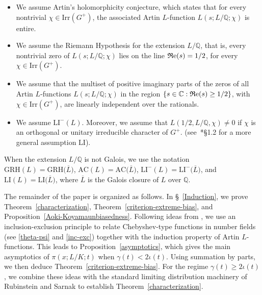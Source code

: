 \documentclass[12pt]{amsart}
\numberwithin{equation}{section}
\newcommand{\Q}{\mathbb Q}
\newcommand{\C}{\mathbb C}
\renewcommand{\Re}{{\mathfrak R}{\rm e}}
\theoremstyle{definition}
\theoremstyle{remark}
\begin{document}
\begin{itemize}
    \item[$\mathrm{AC}(L)$:] We assume Artin's holomorphicity conjecture, which states that for every nontrivial $\chi \in \mathrm{Irr}(G^+)$, the associated Artin $L$-function $L(s; L/\Q; \chi)$ is entire.
    
    \item[$\mathrm{GRH}(L)$:] We assume the Riemann Hypothesis for the extension $L/\Q$, that is, every nontrivial zero of $L(s; L/\Q; \chi)$ lies on the line $\Re(s) = 1/2$, for every $\chi \in \mathrm{Irr}(G^+)$.
    
    \item[$\mathrm{LI}^-(L)$:] We assume that the multiset of positive imaginary parts of the zeros of all Artin $L$-functions $L(s; L/\Q; \chi)$ in the region $\{s \in \C : \Re(s) \ge 1/2\}$, with $\chi \in \mathrm{Irr}(G^+)$, are linearly independent over the rationals.
    
    \item[$\mathrm{LI}(L)$:] We assume $\mathrm{LI}^-(L)$. Moreover, we assume that $L(1/2, L/\Q, \chi) \neq 0$ if $\chi$ is an orthogonal or unitary irreducible character of $G^+$. (see~\cite{FJ}*{\S 1.2} for a more general assumption $\mathrm{LI}$).
\end{itemize}
When the extension $L/\Q$ is not Galois, we use the notation $\mathrm{GRH}(L)=\mathrm{GRH}\bigl(\overline{L}\bigr)$, $\mathrm{AC}(L)=\mathrm{AC}\bigl(\overline{L}\bigr)$, $\mathrm{LI}^-(L)=\mathrm{LI}^-\bigl(\overline{L}\bigr)$, and $\mathrm{LI}(L)=\mathrm{LI}\bigl(\overline{L}\bigr)$, where $\overline{L}$ is the Galois closure of $L$ over $\Q$.


The remainder of the paper is organized as follows. In \S~\ref{Induction}, we prove Theorem~\ref{characterization}, Theorem~\ref{criterion-extreme-bias}, and Proposition~\ref{Aoki-Koyamaunbiasedness}. Following ideas from \cites{Hay, FJ2}, we use an inclusion-exclusion principle to relate Chebyshev-type functions in number fields (see \eqref{theta-psi} and \eqref{inc-exc}) together with the induction property of Artin $L$-functions. This leads to Proposition~\ref{asymptotics}, which gives the main asymptotics of $\pi(x;L/K;t)$ when $\gamma(t)<2\iota(t)$. Using summation by parts, we then deduce Theorem~\ref{criterion-extreme-bias}. For the regime $\gamma(t)\ge 2\iota(t)$, we combine these ideas with the standard limiting distribution machinery of Rubinstein and Sarnak to establish Theorem~\ref{characterization}.
\end{document}
